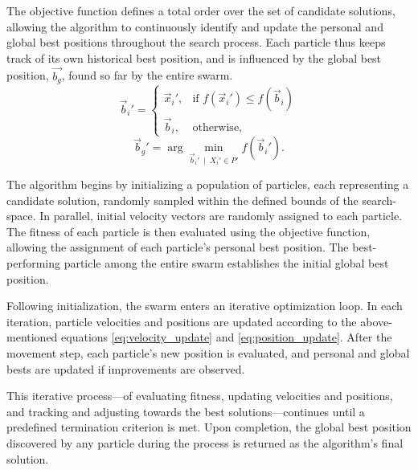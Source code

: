 {The objective function defines a total order over the set of candidate solutions, allowing the algorithm to continuously identify and update the personal and global best positions throughout the search process. Each particle thus keeps track of its own historical best position, and is influenced by the global best position, 
\(\vec{b_g}\), found so far by the entire swarm.
\begin{equation}\label{eq:pbest_update}
\vec{b}_i' =
\begin{cases}
\vec{x}_i', & \text{if } f(\vec{x}_i') \leq f(\vec{b}_i) \\[6pt]
\vec{b}_i, & \text{otherwise,}
\end{cases}
\end{equation}
\begin{equation}\label{eq:gbest_update}
\vec{b}_g' = \arg\min_{{\vec{b}_i'}\ \mid\ X_i' \in P'} f(\vec{b}_i').
\end{equation}



The algorithm begins by initializing a population of particles, each representing a candidate solution, randomly sampled within the defined bounds of the \gls{search-space}. In parallel, initial velocity vectors are randomly assigned to each particle. The fitness of each particle is then evaluated using the objective function, allowing the assignment of each particle's personal best position. The best-performing particle among the entire swarm establishes the initial global best position.

Following initialization, the swarm enters an iterative optimization loop. In each iteration, particle velocities and positions are updated according to the above-mentioned equations \eqref{eq:velocity_update} and \eqref{eq:position_update}. After the movement step, each particle's new position is evaluated, and personal and global bests are updated if improvements are observed.


This iterative process---of evaluating fitness, updating velocities and positions, and tracking and adjusting towards the best solutions---continues until a predefined termination criterion is met.
Upon completion, the global best position discovered by any particle during the process is returned as the algorithm's final solution.

\vspace{.935em}

}
